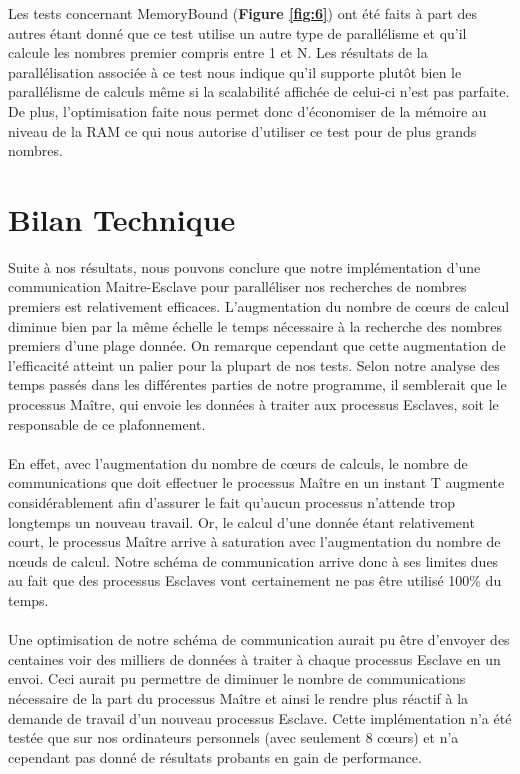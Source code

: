 	Les tests concernant MemoryBound (\textbf{Figure \ref{fig:6}}) ont été faits à part des autres étant donné que ce test utilise un autre type de parallélisme et qu'il calcule les nombres premier compris entre 1 et N. Les résultats de la parallélisation associée à ce test nous indique qu'il supporte plutôt bien le parallélisme de calculs même si la scalabilité affichée de celui-ci n'est pas parfaite. De plus, l'optimisation faite nous permet donc d'économiser de la mémoire au niveau de la RAM ce qui nous autorise d'utiliser ce test pour de plus grands nombres.
	\section{Bilan Technique}	
		
Suite à nos résultats, nous pouvons conclure que notre implémentation d'une communication Maitre-Esclave pour paralléliser nos recherches de nombres premiers est relativement efficaces.
L'augmentation du nombre de cœurs de calcul diminue bien par la même échelle le temps nécessaire à la recherche des nombres premiers d'une plage donnée.
On remarque cependant que cette augmentation de l'efficacité atteint un palier pour la plupart de nos tests. Selon notre analyse des temps passés dans les différentes parties de notre programme, il semblerait que le processus Maître, qui envoie les données à traiter aux processus Esclaves, soit le responsable de ce plafonnement.
\paragraph{}En effet, avec l'augmentation du nombre de cœurs de calculs, le nombre de communications que doit effectuer le processus Maître en un instant T augmente considérablement afin d'assurer le fait qu'aucun processus n'attende trop longtemps un nouveau travail.
Or, le calcul d'une donnée étant relativement court, le processus Maître arrive à saturation avec l'augmentation du nombre de nœuds de calcul.
Notre schéma de communication arrive donc à ses limites dues au fait que des processus Esclaves vont certainement ne pas être utilisé 100\% du temps.

\paragraph{}Une optimisation de notre schéma de communication aurait pu être d'envoyer des centaines voir des milliers de données à traiter à chaque processus Esclave en un envoi.
Ceci aurait pu permettre de diminuer le nombre de communications nécessaire de la part du processus Maître et ainsi le rendre plus réactif à la demande de travail d'un nouveau processus Esclave.
Cette implémentation n'a été testée que sur nos ordinateurs personnels (avec seulement 8 cœurs) et n'a cependant pas donné de résultats probants en gain de performance.

